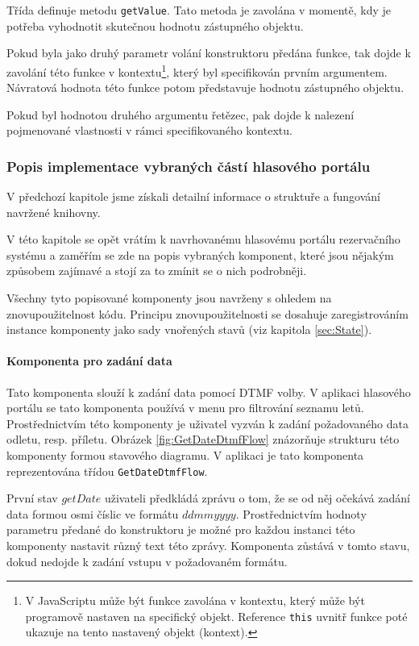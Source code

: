 \documentclass[ing,male,java,dept460]{diploma}						%
\begin{document}
Třída definuje metodu \texttt{getValue}. Tato metoda je zavolána v momentě, kdy je potřeba vyhodnotit skutečnou hodnotu zástupného objektu.

Pokud byla jako druhý parametr volání konstruktoru předána funkce, tak dojde k zavolání této funkce v kontextu\footnote{V JavaScriptu může být funkce zavolána v kontextu, který může být programově nastaven na specifický objekt. Reference \texttt{this} uvnitř funkce poté ukazuje na tento nastavený objekt (kontext).}, který byl specifikován prvním argumentem. Návratová hodnota této funkce potom představuje hodnotu zástupného objektu.

Pokud byl hodnotou druhého argumentu řetězec, pak dojde k nalezení pojmenované vlastnosti v rámci specifikovaného kontextu.

\subsubsection{Popis implementace vybraných částí hlasového portálu}
V předchozí kapitole jsme získali detailní informace o struktuře a fungování navržené knihovny.

V této kapitole se opět vrátím k navrhovanému hlasovému portálu rezervačního systému a zaměřím se zde na popis vybraných komponent, které jsou nějakým způsobem zajímavé a stojí za to zmínit se o nich podrobněji.

Všechny tyto popisované komponenty jsou navrženy s ohledem na znovupoužitelnost kódu. Principu znovupoužitelnosti se dosahuje zaregistrováním instance komponenty jako sady vnořených stavů (viz kapitola \ref{sec:State}).

\paragraph{Komponenta pro zadání data}
Tato komponenta slouží k zadání data pomocí DTMF volby. V aplikaci hlasového portálu se tato komponenta používá v menu pro filtrování seznamu letů. Prostřednictvím této komponenty je uživatel vyzván k zadání požadovaného data odletu, resp. příletu. Obrázek \ref{fig:GetDateDtmfFlow} znázorňuje strukturu této komponenty formou stavového diagramu. V aplikaci je tato komponenta reprezentována třídou \texttt{GetDateDtmfFlow}.

První stav $getDate$ uživateli předkládá zprávu o tom, že se od něj očekává zadání data formou osmi číslic ve formátu $ddmmyyyy$. Prostřednictvím hodnoty parametru předané do konstruktoru je možné pro každou instanci této komponenty nastavit různý text této zprávy. Komponenta zůstává v tomto stavu, dokud nedojde k zadání vstupu v požadovaném formátu.
\end{document}

